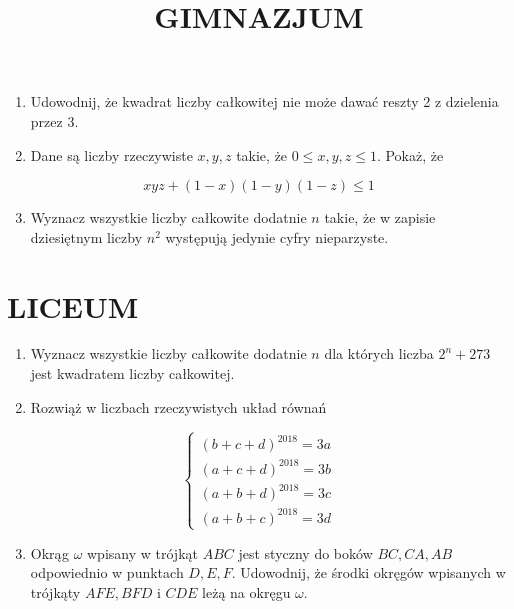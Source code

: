\documentclass[10pt]{article}
\title{GIMNAZJUM }
\author{}
\date{}
\begin{document}
\maketitle
\begin{enumerate}
  \item Udowodnij, że kwadrat liczby całkowitej nie może dawać reszty 2 z dzielenia przez 3.
  \item Dane są liczby rzeczywiste \(x, y, z\) takie, że \(0 \leq x, y, z \leq 1\). Pokaż, że
\end{enumerate}

\[
x y z+(1-x)(1-y)(1-z) \leq 1
\]

\begin{enumerate}
  \setcounter{enumi}{2}
  \item Wyznacz wszystkie liczby całkowite dodatnie \(n\) takie, że w zapisie dziesiętnym liczby \(n^{2}\) występują jedynie cyfry nieparzyste.
\end{enumerate}

\section*{LICEUM}
\begin{enumerate}
  \item Wyznacz wszystkie liczby całkowite dodatnie \(n\) dla których liczba \(2^{n}+273\) jest kwadratem liczby całkowitej.
  \item Rozwiąż w liczbach rzeczywistych układ równań
\end{enumerate}

\[
\left\{\begin{array}{l}
(b+c+d)^{2018}=3 a \\
(a+c+d)^{2018}=3 b \\
(a+b+d)^{2018}=3 c \\
(a+b+c)^{2018}=3 d
\end{array}\right.
\]

\begin{enumerate}
  \setcounter{enumi}{2}
  \item Okrąg \(\omega\) wpisany w trójkąt \(A B C\) jest styczny do boków \(B C, C A, A B\) odpowiednio w punktach \(D, E, F\). Udowodnij, że środki okręgów wpisanych w trójkąty \(A F E, B F D\) i \(C D E\) leżą na okręgu \(\omega\).
\end{enumerate}
\end{document}

